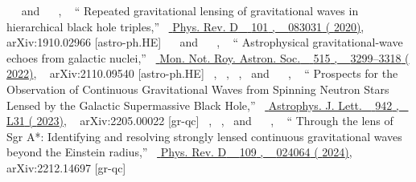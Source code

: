 \documentclass[aps,reprint,superscriptaddress,nofootinbib,floatfix,longbibliography,preprintnumbers]{revtex4-1}
\begin{document}
\begin{thebibliography}{139}
  \BibitemOpen
   { { \  } \  and \   { \  }, \  } {\enquote { {{Repeated gravitational lensing of gravitational waves in hierarchical black hole triples}},} \  }\href {\doibase 10.1103/PhysRevD.101.083031} { { {Phys. Rev. D} \  }  {101} , \   {083031} ( {2020})}, \   {arXiv:1910.02966 [astro-ph.HE]} 
  \BibitemOpen
   { { \  } \  and \   { \  }, \  } {\enquote { {{Astrophysical gravitational-wave echoes from galactic nuclei}},} \  }\href {\doibase 10.1093/mnras/stac1985} { { {Mon. Not. Roy. Astron. Soc.} \  }  {515} , \   {3299--3318} ( {2022})}, \   {arXiv:2110.09540 [astro-ph.HE]} 
  \BibitemOpen
   { { \  },  { \  },  { \  },  \  and \   { \  }, \  } {\enquote { {{Prospects for the Observation of Continuous Gravitational Waves from Spinning Neutron Stars Lensed by the Galactic Supermassive Black Hole}},} \  }\href {\doibase 10.3847/2041-8213/acab50} { { {Astrophys. J. Lett.} \  }  {942} , \   {L31} ( {2023})}, \   {arXiv:2205.00022 [gr-qc]} 
  \BibitemOpen
   { { \  },  { \  },  \  and \   { \  }, \  } {\enquote { {{Through the lens of Sgr A*: Identifying and resolving strongly lensed continuous gravitational waves beyond the Einstein radius}},} \  }\href {\doibase 10.1103/PhysRevD.109.024064} { { {Phys. Rev. D} \  }  {109} , \   {024064} ( {2024})}, \   {arXiv:2212.14697 [gr-qc]} 

\end{thebibliography}
\end{document}
